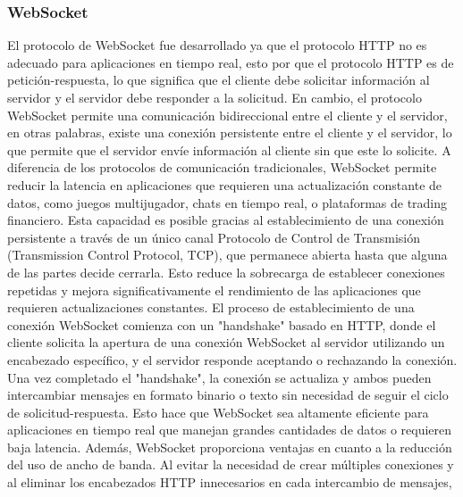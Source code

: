 \subsubsection{WebSocket}
\label{sub:WebSocket}
    El protocolo de WebSocket fue desarrollado ya que el protocolo HTTP no es adecuado para aplicaciones en tiempo real, esto por que 
        el protocolo HTTP es de petici\'on-respuesta, lo que significa que el cliente debe solicitar informaci\'on al servidor y el servidor
        debe responder a la solicitud. En cambio, el protocolo WebSocket permite una comunicaci\'on bidireccional entre el cliente y el servidor,
        en otras palabras, existe una conexi\'on persistente entre el cliente y el servidor, lo que permite que el servidor env\'ie informaci\'on
        al cliente sin que este lo solicite. \cite{Kitamura2012}
    \vskip 0.5cm
        A diferencia de los protocolos de comunicaci\'on tradicionales, WebSocket permite reducir la latencia en aplicaciones que 
            requieren una actualizaci\'on constante de datos, como juegos multijugador, chats en tiempo real, o plataformas de 
            trading financiero. Esta capacidad es posible gracias al establecimiento de una conexi\'on persistente a trav\'es de 
            un \'unico canal Protocolo de Control de Transmisi\'on (Transmission Control Protocol, TCP), que permanece abierta hasta que alguna de las partes decide cerrarla. Esto reduce la sobrecarga 
            de establecer conexiones repetidas y mejora significativamente el rendimiento de las aplicaciones que requieren 
            actualizaciones constantes. \cite{RFC6455}
    \vskip 0.5cm
        El proceso de establecimiento de una conexi\'on WebSocket comienza con un "handshake" basado en HTTP, donde el cliente 
            solicita la apertura de una conexi\'on WebSocket al servidor utilizando un encabezado espec\'ifico, y el servidor 
            responde aceptando o rechazando la conexi\'on. Una vez completado el "handshake", la conexi\'on se actualiza y ambos 
            pueden intercambiar mensajes en formato binario o texto sin necesidad de seguir el ciclo de solicitud-respuesta. 
            Esto hace que WebSocket sea altamente eficiente para aplicaciones en tiempo real que manejan grandes cantidades de 
            datos o requieren baja latencia. \cite{FetteMelnikov}
    \vskip 0.5cm
        Adem\'as, WebSocket proporciona ventajas en cuanto a la reducci\'on del uso de ancho de banda. Al evitar la necesidad de 
            crear m\'ultiples conexiones y al eliminar los encabezados HTTP innecesarios en cada intercambio de mensajes, 
